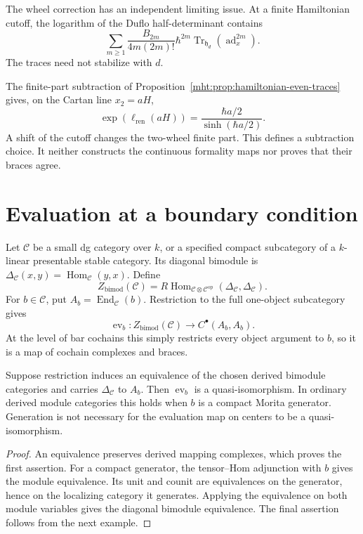 The wheel correction has an independent limiting issue. At a
finite Hamiltonian cutoff, the logarithm of the Duflo
half-determinant contains
\[
 \sum_{m\geq1}\frac{B_{2m}}{4m(2m)!}\hbar^{2m}
       \operatorname{Tr}_{\mathfrak h_d}(\operatorname{ad}_x^{2m}).
\]
The traces need not stabilize with $d$. 

The finite-part
subtraction of Proposition~\ref{mht:prop:hamiltonian-even-traces}
gives, on the Cartan line $x_2=aH$,
\[
 \exp(\ell_{\mathrm{ren}}(aH))
          =\frac{\hbar a/2}{\sinh(\hbar a/2)}.
\]
A shift of the cutoff changes the two-wheel finite part. This
defines a subtraction choice. It neither constructs the
continuous formality maps nor proves that their braces agree.

\section{Evaluation at a boundary condition}

Let $\mathcal C$ be a small dg category over $k$, or a specified
compact subcategory of a $k$-linear presentable stable category. Its
diagonal bimodule is
$\Delta_{\mathcal C}(x,y)=\operatorname{Hom}_{\mathcal C}(y,x)$.
Define
\[
 Z_{\mathrm{bimod}}(\mathcal C)
 =R\operatorname{Hom}_{\mathcal C\otimes\mathcal C^{\mathrm{op}}}
                    (\Delta_{\mathcal C},\Delta_{\mathcal C}).
\]
For $b\in\mathcal C$, put $A_b=\operatorname{End}_{\mathcal C}(b)$.
Restriction to the full one-object subcategory gives
\[
 \operatorname{ev}_b:Z_{\mathrm{bimod}}(\mathcal C)
                     \longrightarrow C^\bullet(A_b,A_b).
\]
At the level of bar cochains this simply restricts every object
argument to $b$, so it is a map of cochain complexes and braces.

\begin{proposition}\label{mht:prop:centre-morita-sufficient}
Suppose restriction induces an equivalence of the chosen derived
bimodule categories and carries $\Delta_{\mathcal C}$ to $A_b$.
Then $\operatorname{ev}_b$ is a quasi-isomorphism. In ordinary
derived module categories this holds when $b$ is a compact Morita
generator. Generation is not necessary for the evaluation map
on centers to be a quasi-isomorphism.
\end{proposition}

\begin{proof}
An equivalence preserves derived mapping complexes, which proves
the first assertion. For a compact generator, the tensor--Hom
adjunction with $b$ gives the module equivalence. Its unit and
counit are equivalences on the generator, hence on the localizing
category it generates. Applying the equivalence on both module
variables gives the diagonal bimodule equivalence. The final
assertion follows from the next example.
\end{proof}

